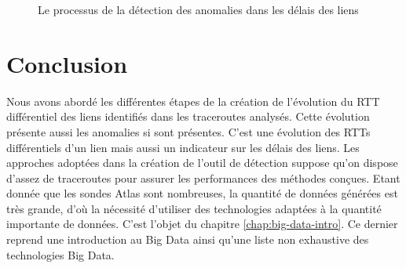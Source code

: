 \begin{figure}[h]
	\centering
	\resizebox{\textwidth}{!}{
		
	}
	\caption{Le processus de la détection des anomalies dans les délais des liens}
	\label{fig:process-rttanalysis_tex}
\end{figure}




\section{Conclusion}

Nous avons abordé les différentes étapes de la création de l'évolution du RTT différentiel des liens identifiés dans les traceroutes analysés.  Cette évolution présente aussi les anomalies si sont présentes. C'est une évolution des RTTs différentiels d'un lien mais aussi un indicateur sur les délais des liens. Les approches adoptées dans la création de l'outil de détection suppose qu'on dispose d'assez de traceroutes pour assurer les performances des méthodes conçues. Etant donnée que les sondes Atlas sont nombreuses,  la quantité de données générées est très grande, d'où la nécessité d'utiliser des technologies adaptées à la quantité importante de données. C'est l'objet du chapitre \ref{chap:big-data-intro}. Ce dernier reprend une introduction au Big Data ainsi qu'une liste non exhaustive des technologies Big Data.

